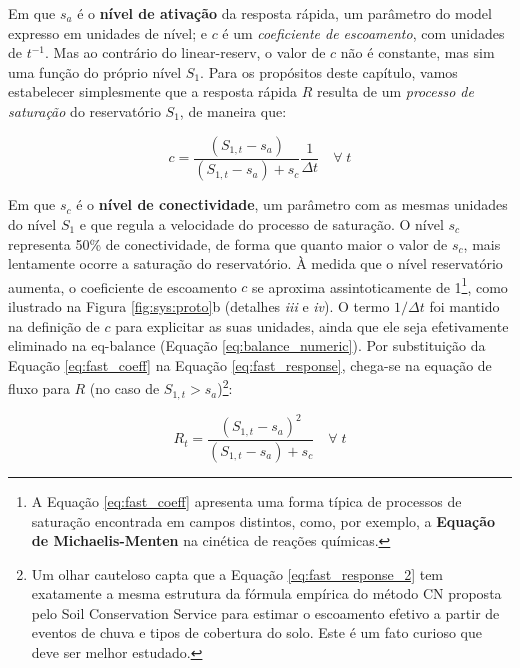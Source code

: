 \documentclass[./main.tex]{subfiles}
\begin{document}
Em que $s_a$ é o \textbf{nível de ativação} da resposta rápida, um parâmetro do \gls{model} expresso em unidades de nível; e  $c$ é um \textit{coeficiente de escoamento}, com unidades de $t^{-1}$. Mas ao contrário do \gls{linear-reserv}, o valor de $c$ não é constante, mas sim uma função do próprio nível $S_1$. Para os propósitos deste capítulo, vamos estabelecer simplesmente que a resposta rápida $R$ resulta de um \textit{processo de saturação} do reservatório $S_1$, de maneira que:
\begin{linenomath*}
\begin{equation} 
	\label{eq:fast_coeff}
	c = \frac{(S_{1,t} - s_a)}{(S_{1,t} - s_a) + s_c} \frac{1}{\Delta t} \quad \forall\;t
\end{equation}
\end{linenomath*}
Em que $s_c$ é o \textbf{nível de conectividade}, um parâmetro com as mesmas unidades do nível $S_1$ e que regula a velocidade do processo de saturação. O nível $s_c$ representa 50\% de conectividade, de forma que quanto maior o valor de $s_c$, mais lentamente ocorre a saturação do reservatório. À medida que o nível reservatório aumenta, o coeficiente de escoamento $c$ se aproxima assintoticamente de 1\footnote{A Equação \eqref{eq:fast_coeff} apresenta uma forma típica de processos de saturação encontrada em campos distintos, como, por exemplo, a \textbf{Equação de Michaelis-Menten} na cinética de reações químicas.}, como ilustrado na Figura \ref{fig:sys:proto}b (detalhes \textrm{\textit{iii}} e \textrm{\textit{iv}}). O termo $1/ \Delta t$ foi mantido na definição de $c$ para explicitar as suas unidades, ainda que ele seja efetivamente eliminado na \gls{eq-balance} (Equação \eqref{eq:balance_numeric}). Por substituição da Equação \eqref{eq:fast_coeff} na Equação \eqref{eq:fast_response}, chega-se na equação de fluxo para $R$ (no caso de $S_{1,t} > s_a$)\footnote{Um olhar cauteloso capta que a Equação \eqref{eq:fast_response_2} tem exatamente a mesma estrutura da fórmula empírica do método CN proposta pelo Soil Conservation Service para estimar o escoamento efetivo a partir de eventos de chuva e tipos de cobertura do solo. Este é um fato curioso que deve ser melhor estudado.}:
\begin{linenomath*}
\begin{equation} 
\label{eq:fast_response_2}
 R_{t} = \frac{(S_{1,t} - s_a)^2}{(S_{1,t} - s_a) + s_c} \quad \forall\;t
\end{equation}
\end{linenomath*}
\end{document}

